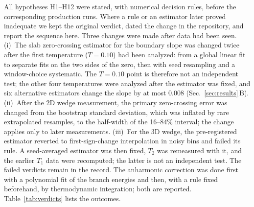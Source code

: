 \documentclass[pre,twocolumn,superscriptaddress,amsmath,amssymb,floatfix]{revtex4-2}
\begin{document}
All hypotheses H1--H12 were stated, with numerical decision rules, before the corresponding production runs. Where a rule or an estimator later proved inadequate we kept the original verdict, dated the change in the repository, and report the sequence here. Three changes were made after data had been seen. (i)~The slab zero-crossing estimator for the boundary slope was changed twice after the first temperature ($T=0.10$) had been analyzed: from a global linear fit to separate fits on the two sides of the zero, then with seed resampling and a window-choice systematic. The $T=0.10$ point is therefore not an independent test; the other four temperatures were analyzed after the estimator was fixed, and six alternative estimators change the slope by at most $0.008$ (Sec.~\ref{sec:results}\,B). (ii)~After the 2D wedge measurement, the primary zero-crossing error was changed from the bootstrap standard deviation, which was inflated by rare extrapolated resamples, to the half-width of the 16--84\% interval; the change applies only to later measurements. (iii)~For the 3D wedge, the pre-registered estimator reverted to first-sign-change interpolation in noisy bins and failed its rule. A seed-averaged estimator was then fixed, $T_2$ was remeasured with it, and the earlier $T_1$ data were recomputed; the latter is not an independent test. The failed verdicts remain in the record. The anharmonic correction was done first with a polynomial fit of the branch energies and then, with a rule fixed beforehand, by thermodynamic integration; both are reported. Table~\ref{tab:verdicts} lists the outcomes.
\end{document}
